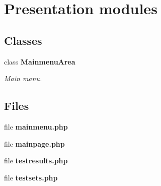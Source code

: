 \section{Presentation modules}
\label{group__OTK__UI__LAYER}
\subsection*{Classes}
\begin{DoxyCompactItemize}
\item 
class {\bf MainmenuArea}
\begin{DoxyCompactList}\small\item\em Main manu. \end{DoxyCompactList}\end{DoxyCompactItemize}
\subsection*{Files}
\begin{DoxyCompactItemize}
\item 
file {\bf mainmenu.php}
\item 
file {\bf mainpage.php}
\item 
file {\bf testresults.php}
\item 
file {\bf testsets.php}
\end{DoxyCompactItemize}
